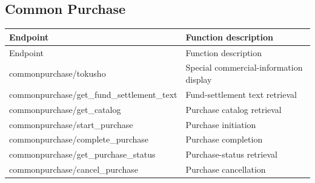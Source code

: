 \subsection{Common Purchase}

\begin{longtable}{>{\ttfamily}p{}p{}}
\toprule
Endpoint & Function description \\
\midrule
\endfirsthead%

\toprule
Endpoint & Function description \\
\midrule
\endhead%

commonpurchase/tokusho
    & Special commercial-information display \\

commonpurchase/get\_fund\_settlement\_text
    & Fund-settlement text retrieval \\

commonpurchase/get\_catalog
    & Purchase catalog retrieval \\

commonpurchase/start\_purchase
    & Purchase initiation \\

commonpurchase/complete\_purchase
    & Purchase completion \\

commonpurchase/get\_purchase\_status
    & Purchase-status retrieval \\

commonpurchase/cancel\_purchase
    & Purchase cancellation \\

\bottomrule
\end{longtable}